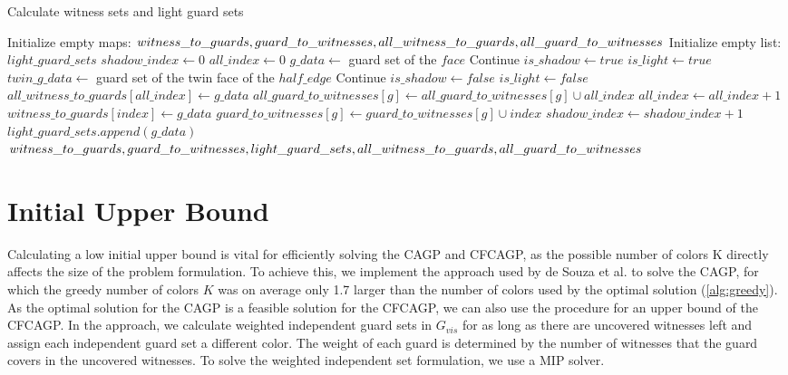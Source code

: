 \begin{algorithm}
\caption{Calculate witness sets and light guard sets}\label{alg:AVP_processing}
\begin{algorithmic}[1]
\State Initialize empty maps: $witness\_to\_guards, guard\_to\_witnesses, all\_witness\_to\_guards,\linebreak all\_guard\_to\_witnesses$
\State Initialize empty list: $light\_guard\_sets$
\State $shadow\_index\gets 0$
\State $all\_index\gets 0$
    \State $g\_data\gets$ guard set of the $face$
        \State Continue
    \EndIf
    \State $is\_shadow\gets true$
    \State $is\_light\gets true$
        \State $twin\_g\_data\gets$ guard set of the twin face of the $half\_edge$
            \State Continue
        \EndIf
            \State $is\_shadow\gets false$
        \EndIf
            \State $is\_light\gets false$
        \EndIf
    \EndFor
    \State $all\_witness\_to\_guards[all\_index]\gets g\_data$
        \State $all\_guard\_to\_witnesses[g]\gets all\_guard\_to\_witnesses[g]\cup all\_index$
    \EndFor
    \State $all\_index\gets all\_index + 1$
        \State $witness\_to\_guards[index]\gets g\_data$
            \State $guard\_to\_witnesses[g]\gets guard\_to\_witnesses[g]\cup index$
        \EndFor
        \State $shadow\_index\gets shadow\_index + 1$
    \EndIf
        \State $light\_guard\_sets.append(g\_data)$
    \EndIf
\EndFor
\Return $witness\_to\_guards, guard\_to\_witnesses, light\_guard\_sets, all\_witness\_to\_guards,\linebreak all\_guard\_to\_witnesses$
\EndProcedure
\end{algorithmic}
\end{algorithm}

\section{Initial Upper Bound}
Calculating a low initial upper bound is vital for efficiently solving the CAGP and CFCAGP, as the possible number of colors K directly affects the size of the problem formulation. To achieve this, we implement the approach used by de Souza et al. \cite{zambon2014exact} to solve the CAGP, for which the greedy number of colors $K$ was on average only 1.7 larger than the number of colors used by the optimal solution (\cref{alg:greedy}). As the optimal solution for the CAGP is a feasible solution for the CFCAGP, we can also use the procedure for an upper bound of the CFCAGP. In the approach, we calculate weighted independent guard sets in $G_{vis}$ for as long as there are uncovered witnesses left and assign each independent guard set a different color. The weight of each guard is determined by the number of witnesses that the guard covers in the uncovered witnesses. To solve the weighted independent set formulation, we use a MIP solver.

